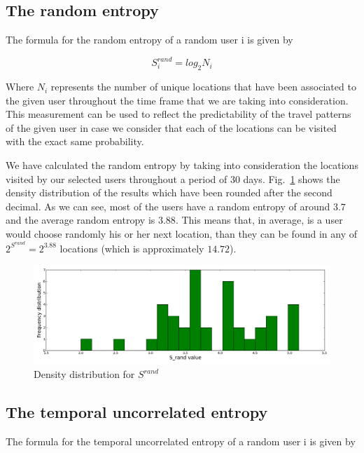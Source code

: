 \subsection{The random entropy}
\label{r_e}

The formula for the random entropy of a random user i is given by

\begin{equation}
S_{i}^{rand} = log_{2}N_{i}
\end{equation}

Where $N_{i}$ represents the number of unique locations that
have been associated to the given user throughout the time frame that we are
taking into consideration. This measurement can be used to reflect the
predictability of the travel patterns of the given user in case we consider that
each of the locations can be visited with the exact same probability.

We have calculated the random entropy by taking into consideration the locations
visited by our selected users throughout a period of $30$ days.
Fig.~\ref{dis_r_e} shows the density distribution of the results which have been
rounded after the second decimal. As we can see, most of the users have a random
entropy of around $3.7$ and the average random entropy is $3.88$. This means
that, in average, is a user would choose randomly his or her next location, than
they can be found in any of $2^{S^{rand}} = 2^{3.88}$ locations (which is
approximately $14.72$).

\begin{figure}[!h]
\centering
\includegraphics[width=\textwidth]{figures/entro_pred/rand_entro_distrib.png}
\caption{Density distribution for $S^{rand}$}
\label{dis_r_e}
\end{figure}

\subsection{The temporal uncorrelated entropy}
\label{tu_e}

The formula for the temporal uncorrelated entropy of a random user i is given by

